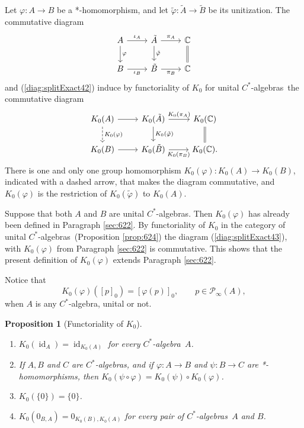 \documentclass{book}
\newtheorem{proposition}[definition]{Proposition}
\def\cstar{\(C^*\)-algebra}
\def\cstars{\(C^*\)-algebras}
\begin{document}
Let \(\varphi:A\to B\) be a *-homomorphism, and let \(\tilde{\varphi}:\tilde{A}\to\tilde{B}\) be its unitization. 
The commutative diagram
\begin{equation*}
  \begin{tikzcd}
    A\arrow[r,"\iota_A"]\arrow[d,"\varphi"]&\tilde{A}\arrow[r,"\pi_A"]\arrow[d,"\tilde{\varphi}"]&\mathbb{C}\arrow[d, equal]\\    
    B\arrow[r,"\iota_B",swap]&\tilde{B}\arrow[r,"\pi_B",swap]&\mathbb{C}
  \end{tikzcd}
\end{equation*}
and (\ref{diag:splitExact42}) induce by functoriality of \(K_0\) for unital \cstars\ the commutative diagram
\begin{equation}\label{diag:splitExact43}
  \begin{tikzcd}
    K_0(A)\arrow[r]\arrow[d,"K_0(\varphi)",dashed]&K_0(\tilde{A})\arrow[r,"K_0(\pi_A)"]\arrow[d,"K_0(\tilde{\varphi})"]&K_0(\mathbb{C})\arrow[d, equal]\\    
    K_0(B)\arrow[r]&K_0(\tilde{B})\arrow[r,"K_0(\pi_B)",swap]&K_0(\mathbb{C}).
  \end{tikzcd}
\end{equation}
There is one and only one group homomorphism \(K_0(\varphi):K_0(A)\to K_0(B)\), indicated with a dashed arrow, that makes the diagram commutative, and \(K_0(\varphi)\)
is the restriction of \(K_0(\tilde{\varphi})\) to \(K_0(A)\).\par
Suppose that both \(A\) and \(B\) are unital \cstars. Then \(K_0(\varphi)\) has already been defined in Paragraph \ref{sec:622}.
By functoriality of \(K_0\) in the category of unital \cstars\ (Proposition \ref{prop:624}) the diagram (\ref{diag:splitExact43}), with
\(K_0(\varphi)\) from Paragraph \ref{sec:622} is commutative. This shows that the present definition of \(K_0(\varphi)\) extends Paragraph \ref{sec:622}.\par
Notice that 
\begin{equation}\label{eq:K044}
  K_0(\varphi)({[p]}_0)={[\varphi(p)]}_0,\qquad p\in\mathcal{P}_\infty(A),
\end{equation}
when \(A\) is any \cstar, unital or not.
\begin{proposition}[Functoriality of \(K_0\)]\label{prop:Lars713}
  \begin{enumerate}
    \item \(K_0(\operatorname{id}_A)=\operatorname{id}_{K_0(A)}\) for every \cstar\ \(A\).
    \item If \(A,B\) and \(C\) are \cstars, and if \(\varphi:A\to B\) and \(\psi:B\to C\) are *-homomorphisms, then \(K_0(\psi\circ\varphi)=K_0(\psi)\circ K_0(\varphi)\).
    \item \(K_0(\{0\})=\{0\}\).
    \item \(K_0(0_{B,A})=0_{K_0(B),K_0(A)}\) for every pair of \cstars\ \(A\) and \(B\).
  \end{enumerate}
\end{proposition}
\end{document}
